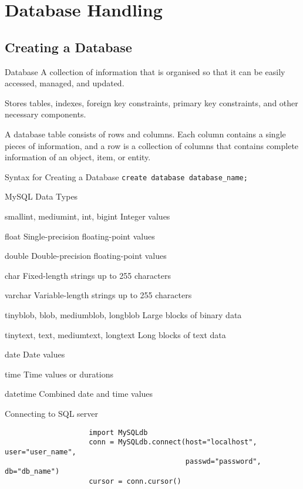 \documentclass[notes.tex]{subfiles}
\begin{document}
	\setcounter{chapter}{3}
	\chapter{Database Handling}
		\section{Creating a Database}
			\begin{definition}{Database}
				A collection of information that is organised so that it can be easily accessed, managed, and updated.

				Stores tables, indexes, foreign key constraints, primary key constraints, and other necessary components.

				A database table consists of rows and columns. Each column contains a single pieces of information, and a row is a collection of columns that contains complete information of an object, item, or entity.
			\end{definition}
			\begin{sidenote}{Syntax for Creating a Database}
				\verb|create database database_name;|
			\end{sidenote}
			\begin{sidenote}{MySQL Data Types}
				\begin{descriptimize}[nosep]
					\item[smallint, mediumint, int, bigint] Integer values
					\item[float] Single-precision floating-point values 
					\item[double] Double-precision floating-point values
					\item[char] Fixed-length strings up to 255 characters
					\item[varchar] Variable-length strings up to 255 characters
					\item[tinyblob, blob, mediumblob, longblob] Large blocks of binary data
					\item[tinytext, text, mediumtext, longtext] Long blocks of text data
					\item[date] Date values
					\item[time] Time values or durations
					\item[datetime] Combined date and time values    
				\end{descriptimize}
			\end{sidenote}
			\begin{sidenote}{Connecting to SQL server}
				\begin{verbatim}
					import MySQLdb
					conn = MySQLdb.connect(host="localhost", user="user_name",
					                       passwd="password", db="db_name")
					cursor = conn.cursor()
				\end{verbatim}
			\end{sidenote}
\end{document}

